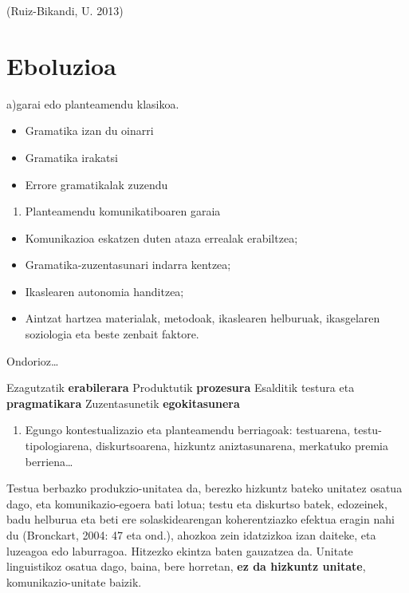 \documentclass[
]{book}
\providecommand{\tightlist}{%
  \setlength{\itemsep}{0pt}\setlength{\parskip}{0pt}}
\begin{document}
(Ruiz-Bikandi, U. 2013)

\hypertarget{eboluzioa}{%
\section{Eboluzioa}\label{eboluzioa}}

a)garai edo planteamendu klasikoa.

\begin{itemize}
\tightlist
\item
  Gramatika izan du oinarri
\item
  Gramatika irakatsi
\item
  Errore gramatikalak zuzendu
\end{itemize}

\begin{enumerate}
\def\labelenumi{\alph{enumi})}
\setcounter{enumi}{1}
\tightlist
\item
  Planteamendu komunikatiboaren garaia
\end{enumerate}

\begin{itemize}
\tightlist
\item
  Komunikazioa eskatzen duten ataza errealak erabiltzea;
\item
  Gramatika-zuzentasunari indarra kentzea;
\item
  Ikaslearen autonomia handitzea;
\item
  Aintzat hartzea materialak, metodoak, ikaslearen helburuak, ikasgelaren soziologia eta beste zenbait faktore.
\end{itemize}

Ondorioz\ldots{}

Ezagutzatik \textbf{erabilerara}
Produktutik \textbf{prozesura}
Esalditik testura eta \textbf{pragmatikara}
Zuzentasunetik \textbf{egokitasunera}

\begin{enumerate}
\def\labelenumi{\alph{enumi})}
\setcounter{enumi}{2}
\tightlist
\item
  Egungo kontestualizazio eta planteamendu berriagoak: testuarena, testu-tipologiarena, diskurtsoarena, hizkuntz aniztasunarena, merkatuko premia berriena\ldots{}
\end{enumerate}

Testua berbazko produkzio-unitatea da, berezko hizkuntz bateko unitatez
osatua dago, eta komunikazio-egoera bati lotua; testu eta diskurtso batek, edozeinek, badu helburua eta beti ere solaskidearengan koherentziazko efektua eragin nahi du (Bronckart, 2004: 47 eta ond.), ahozkoa zein idatzizkoa izan daiteke, eta luzeagoa edo laburragoa. Hitzezko ekintza baten gauzatzea da. Unitate linguistikoz osatua dago, baina, bere horretan, \textbf{ez da hizkuntz unitate}, komunikazio-unitate baizik.
\end{document}

